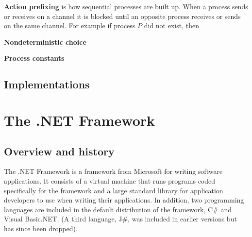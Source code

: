 	\textbf{Action prefixing} is how sequential processes are built up. When a process sends or receives on a channel it is blocked until an opposite process receives or sends on the same channel. For example if process $P$ did not exist, then

	\textbf{Nondeterministic choice}

	\textbf{Process constants}
	
\subsection{Implementations}
	

\section{The .NET Framework}

\subsection{Overview and history}
	The .NET Framework is a framework from Microsoft for writing software 
	applications. It consists of a virtual machine that runs programs coded 
	specifically for the framework and a large standard library for application 
	developers to use when writing their applications. In addition, two 
	programming languages are included in the default distribution of the 
	framework, C\# and Visual Basic.NET. (A third language, J\#, was included in
	earlier versions but has since been dropped).

